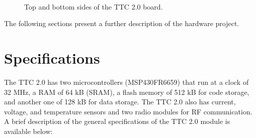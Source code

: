 \begin{figure}[!ht]
    \begin{center}
        ~
        \caption{Top and bottom sides of the TTC 2.0 board.}
        \label{fig:ttc2-3d-surface}
    \end{center}
\end{figure}

The following sections present a further description of the hardware project.

\section{Specifications}

The TTC 2.0 has two microcontrollers (MSP430FR6659) that run at a clock of 32 MHz, a RAM of 64 kB (SRAM), a flash memory of 512 kB for code storage, and another one of 128 kB for data storage. The TTC 2.0 also has current, voltage, and temperature sensors and two radio modules for RF communication. A brief description of the general specifications of the TTC 2.0 module is available below:

